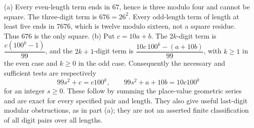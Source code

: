 (a) Every even-length term ends in $67$, hence is three modulo four and cannot be square. The three-digit term is $676=26^2$. Every odd-length term of length at least five ends in $7676$, which is twelve modulo sixteen, not a square residue. Thus $\boxed{676}$ is the only square. (b) Put $c=10a+b$. The $2k$-digit term is $\dfrac{c(100^k-1)}{99}$, and the $2k+1$-digit term is $\dfrac{10c\,100^k-(a+10b)}{99}$, with $k\ge1$ in the even case and $k\ge0$ in the odd case. Consequently the necessary and sufficient tests are respectively
\[99s^2+c=c100^k,\qquad99s^2+a+10b=10c100^k\]
for an integer $s\ge0$. These follow by summing the place-value geometric series and are exact for every specified pair and length. They also give useful last-digit modular obstructions, as in part (a); they are not an asserted finite classification of all digit pairs over all lengths.
